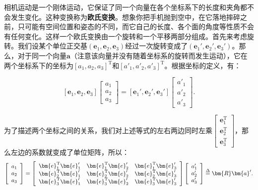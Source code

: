 相机运动是一个刚体运动，它保证了同一个向量在各个坐标系下的长度和夹角都不会发生变化。这种变换称为\textbf{欧氏变换}。想象你把手机抛到空中，在它落地摔碎之前，只可能有空间位置和姿态的不同，而它自己的长度、各个面的角度等性质不会有任何变化。这样一个欧氏变换由一个旋转和一个平移两部分组成。首先来考虑旋转。我们设某个单位正交基$(\bm{e}_1,\bm{e}_2,\bm{e}_3)$经过一次旋转变成了$(\bm{e}_1', \bm{e}_2', \bm{e}_3')$。那么，对于同一个向量$\bm{a}$（注意该向量并没有随着坐标系的旋转而发生运动），它在两个坐标系下的坐标为$[a_1,a_2,a_3]^\mathrm{T}$和$[a'_1, a'_2, a'_3]^\mathrm{T}$。根据坐标的定义，有：

\begin{equation}
\left[ \bm{e}_1,\bm{e}_2,\bm{e}_3 \right]\left[ \begin{array}{l}
{a_1}\\
{a_2}\\
{a_3}
\end{array} \right] = \left[ \bm{e}_1', \bm{e}_2', \bm{e}_3' \right]\left[ \begin{array}{l}
a'_1\\
a'_2\\
a'_3
\end{array} \right].
\end{equation}

为了描述两个坐标之间的关系，我们对上述等式的左右两边同时左乘$\left[ \begin{array}{l}
\bm{e}_1^\mathrm{T}\\
\bm{e}_2^\mathrm{T}\\
\bm{e}_3^\mathrm{T}
\end{array} \right]$，那么左边的系数就变成了单位矩阵，所以：
\clearpage
\begin{equation}
\left[ \begin{array}{l}
{a_1}\\
{a_2}\\
{a_3}
\end{array} \right] = \left[ {\begin{array}{*{20}{c}}
	{\bm{e}_1^\mathrm{T}\bm{e}_1'} & {\bm{e}_1^\mathrm{T}\bm{e}_2'} & {\bm{e}_1^\mathrm{T}\bm{e}_3'}\\
	{\bm{e}_2^\mathrm{T}\bm{e}_1'} & {\bm{e}_2^\mathrm{T}\bm{e}_2'} & {\bm{e}_2^\mathrm{T}\bm{e}_3'}\\
	{\bm{e}_3^\mathrm{T}\bm{e}_1'} & {\bm{e}_3^\mathrm{T}\bm{e}_2'} & {\bm{e}_3^\mathrm{T}\bm{e}_3'}
	\end{array}} \right]\left[ \begin{array}{l}
a_1'\\
a_2'\\
a_3'
\end{array} \right] \buildrel \Delta \over = \bm{R} \bm{a}'.
\end{equation}

